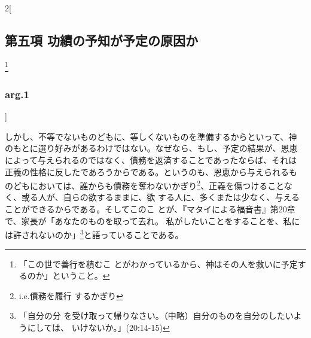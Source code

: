 \documentclass[paper=a4paper,fontsize=10pt,jafontsize=9pt,titlepage]{jlreq}
\begin{document}
\begin{paracol}{2}[\subsection{第五項 功績の予知が予定の原因か}\footnote{「この世で善行を積むこ とがわかっているから、神はその人を救いに予定するのか」ということ。}\subsubsection{arg.1}]
\switchcolumn


しかし、不等でないものどもに、等しくないものを準備するからといって、神
のもとに選り好みがあるわけではない。なぜなら、もし、予定の結果が、恩恵
によって与えられるのではなく、債務を返済することであったならば、それは
正義の性格に反したであろうからである。というのも、恩恵から与えられるも
のどもにおいては、誰からも債務を奪わないかぎり\footnote{i.e.債務を履行
するかぎり}、正義を傷つけることなく、或る人が、自らの欲するままに、欲
する人に、多くまたは少なく、与えることができるからである。そしてこのこ
とが、『マタイによる福音書』第20章で、家長が「あなたのものを取って去れ。
私がしたいことをすることを、私には許されないのか」\footnote{「自分の分
を受け取って帰りなさい。（中略）自分のものを自分のしたいようにしては、
いけないか。」(20:14-15)}と語っていることである。


\switchcolumn*



\end{paracol}
\newpage







\end{document}

